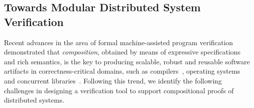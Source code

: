 
\subsection{Towards Modular Distributed System Verification}
\label{sec:towards-comp-verif}

Recent advances in the area of formal machine-assisted program
verification demonstrated that \emph{composition}, obtained by means
of expressive specifications and rich semantics, is the key to
producing scalable, robust and reusable software artifacts in
correctness-critical domains, such as
compilers~\cite{Stewart-al:POPL15,Kumar-al:POPL14}, operating
systems~\cite{Gu-al:POPL15,sel4:CACM10} and concurrent
libraries~\cite{Sergey-al:PLDI15,Gu-al:OSDI16}.
%
%
Following this trend, we identify the following challenges in
designing a verification tool to support compositional proofs of
distributed systems.

